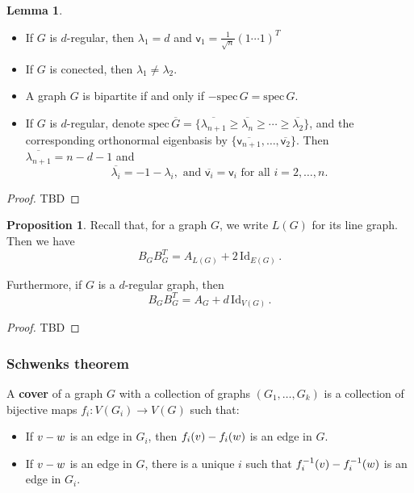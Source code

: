 \documentclass[12pt]{amsart}
\theoremstyle{definition}
\newtheorem{prop}[thm]{Proposition}
\newtheorem{lm}[thm]{Lemma}
\newcommand{\vv}{\mathsf{v}}
\newcommand{\Id}{\mathrm{Id}}
\newcommand{\spec}{\mathrm{spec} }
\begin{document}
\begin{lm}\label{lm:prelspec}
\begin{itemize}
The following facts help us compute the spectrum of graphs: 

\item If $G$ is $d$-regular, then $\lambda_1 = d$ and $\vv_1 = \frac{1}{\sqrt{n}}(1 \cdots 1)^T$

\item If $G$ is conected, then $\lambda_1 \neq \lambda_2$.

\item A graph $G$ is bipartite if and only if $-\spec \, G = \spec \, G$.

\item If $G$ is $d$-regular, denote $\spec \, \overline{G} = \{\overline{\lambda_{n+1}} \geq \overline{\lambda_{n}} \geq \cdots \geq \overline{\lambda_2}\}$, and the corresponding orthonormal eigenbasis by $\{ \overline{\vv_{n+1}}, \ldots, \overline{\vv_2} \}$.
Then 
$\overline{\lambda_{n+1}} = n - d - 1$ and 
$$\overline{\lambda_i} = -1 - \lambda_i, \text{ and }  \overline{\vv_i} = \vv_i \text{ for all $i = 2, \ldots , n$.}$$
\end{itemize}
\end{lm}

\begin{proof}
TBD
\end{proof}

\begin{prop}
Recall that, for a graph $G$, we write $L(G)$ for its line graph.
Then we have
$$B_G B_G^T = A_{L(G)} + 2\, \Id_{E(G)} \, .$$

Furthermore, if $G$ is a $d$-regular graph, then
$$B_G B_G^T = A_G + d\, \Id_{V(G)}\, . $$
\end{prop}

\begin{proof}
TBD
\end{proof}


\subsubsection*{Schwenks theorem}

A \textbf{cover} of a graph $G$ with a collection of graphs $(G_1, \ldots , G_k)$ is a collection of bijective maps $f_i: V(G_i) \to V(G)$ such that:
\begin{itemize}
\item If $v \-- w$ is an edge in $G_i$, then $f_i(v) \-- f_i(w)$ is an edge in $G$.

\item If $v \-- w $ is an edge in $G$, there is a unique $i$ such that $f_i^{-1}(v) \-- f_i^{-1}(w)$ is an edge in $G_i$.
\end{itemize}
\end{document}
